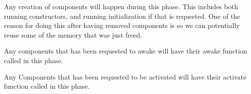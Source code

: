 Any creation of components will happen during this phase. This includes both running constructors, and running initialization if that is requested.
One of the reason for doing this after having removed components is so we can potentially reuse some of the memory that was just freed.

Any components that has been requested to awake will have their awake function called in this phase.

Any Components that has been requested to be activated will have their activate function called in this phase.
